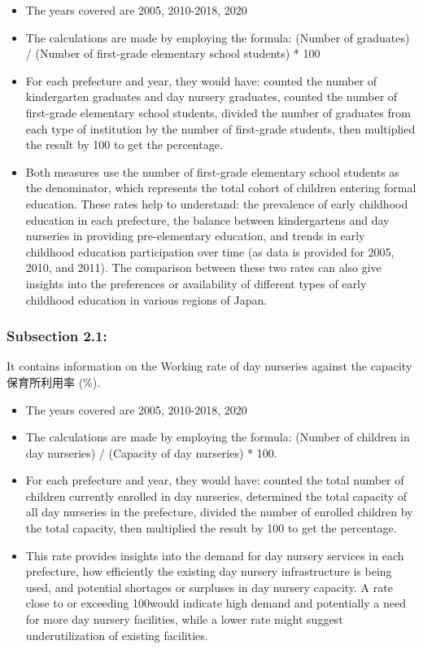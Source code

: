 \documentclass[
]{ltjarticle}
\begin{document}
\begin{itemize}
\item
  The years covered are 2005, 2010-2018, 2020
\item
  The calculations are made by employing the formula: (Number of
  graduates) / (Number of first-grade elementary school students) * 100
\item
  For each prefecture and year, they would have: counted the number of
  kindergarten graduates and day nursery graduates, counted the number
  of first-grade elementary school students, divided the number of
  graduates from each type of institution by the number of first-grade
  students, then multiplied the result by 100 to get the percentage.
\item
  Both measures use the number of first-grade elementary school students
  as the denominator, which represents the total cohort of children
  entering formal education. These rates help to understand: the
  prevalence of early childhood education in each prefecture, the
  balance between kindergartens and day nurseries in providing
  pre-elementary education, and trends in early childhood education
  participation over time (as data is provided for 2005, 2010, and
  2011). The comparison between these two rates can also give insights
  into the preferences or availability of different types of early
  childhood education in various regions of Japan.
\end{itemize}

\hypertarget{subsection-2.1}{%
\subsubsection{Subsection 2.1:}\label{subsection-2.1}}

It contains information on the Working rate of day nurseries against the
capacity 保育所利用率 (\%).

\begin{itemize}
\item
  The years covered are 2005, 2010-2018, 2020
\item
  The calculations are made by employing the formula: (Number of
  children in day nurseries) / (Capacity of day nurseries) * 100.
\item
  For each prefecture and year, they would have: counted the total
  number of children currently enrolled in day nurseries, determined the
  total capacity of all day nurseries in the prefecture, divided the
  number of enrolled children by the total capacity, then multiplied the
  result by 100 to get the percentage.
\item
  This rate provides insights into the demand for day nursery services
  in each prefecture, how efficiently the existing day nursery
  infrastructure is being used, and potential shortages or surpluses in
  day nursery capacity. A rate close to or exceeding 100would indicate
  high demand and potentially a need for more day nursery facilities,
  while a lower rate might suggest underutilization of existing
  facilities.
\end{itemize}
\end{document}
